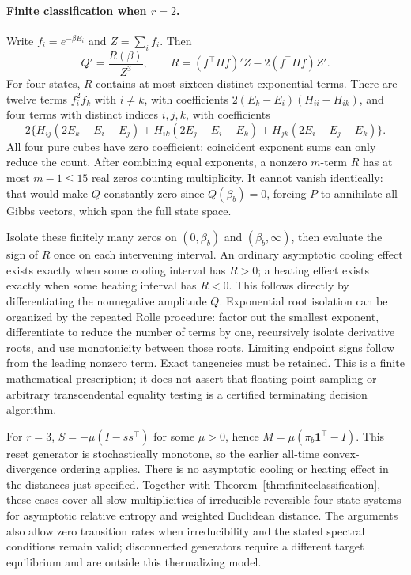 \documentclass[11pt]{article}
\begin{document}
\paragraph{Finite classification when $r=2$.}
Write $f_i=e^{-\beta E_i}$ and $Z=\sum_i f_i$. Then
\[
Q'=\frac{R(\beta)}{Z^3},\qquad
R=(f^\top Hf)'Z-2(f^\top Hf)Z'.
\]
For four states, $R$ contains at most sixteen distinct exponential terms.
There are twelve terms $f_i^2f_k$ with $i\ne k$, with coefficients
$2(E_k-E_i)(H_{ii}-H_{ik})$, and four terms with distinct indices $i,j,k$,
with coefficients
\[
2\{H_{ij}(2E_k-E_i-E_j)+H_{ik}(2E_j-E_i-E_k)
+H_{jk}(2E_i-E_j-E_k)\}.
\]
All four pure cubes have zero coefficient; coincident exponent sums can only
reduce the count. After combining equal exponents, a nonzero $m$-term $R$
has at most $m-1\leq15$ real zeros counting multiplicity. It cannot vanish
identically: that would make $Q$ constantly zero since $Q(\beta_b)=0$, forcing
$P$ to annihilate all Gibbs vectors, which span the full state space.

Isolate these finitely many zeros on $(0,\beta_b)$ and $(\beta_b,\infty)$,
then evaluate the sign of $R$ once on each intervening interval. An ordinary
asymptotic cooling effect exists exactly when some cooling interval has $R>0$;
a heating effect exists exactly when some heating interval has $R<0$.
This follows directly by differentiating the nonnegative amplitude $Q$.
Exponential root isolation can be organized by the repeated Rolle procedure:
factor out the smallest exponent, differentiate to reduce the number of terms
by one, recursively isolate derivative roots, and use monotonicity between
those roots. Limiting endpoint signs follow from the leading nonzero term.
Exact tangencies must be retained. This is a finite mathematical prescription;
it does not assert that floating-point sampling or arbitrary transcendental
equality testing is a certified terminating decision algorithm.

For $r=3$, $S=-\mu(I-ss^\top)$ for some $\mu>0$, hence
$M=\mu(\pi_b\mathbf1^\top-I)$. This reset generator is stochastically monotone,
so the earlier all-time convex-divergence ordering applies. There is no
asymptotic cooling or heating effect in the distances just specified.
Together with Theorem~\ref{thm:finiteclassification}, these cases cover all
slow multiplicities of irreducible reversible four-state systems for
asymptotic relative entropy and weighted Euclidean distance. The arguments
also allow zero transition rates when irreducibility and the stated spectral
conditions remain valid; disconnected generators require a different target
equilibrium and are outside this thermalizing model.
\end{document}
